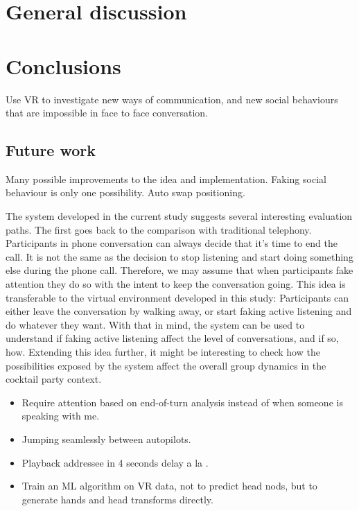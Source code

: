 \documentclass[]{simple-thesis}
\begin{document}
\chapter{General discussion}\label{general_discussion}


\chapter{Conclusions}\label{conclusions}

Use VR to investigate new ways of communication, and new social behaviours that are impossible in face to face conversation.

\section{Future work}

Many possible improvements to the idea and implementation.
Faking social behaviour is only one possibility.
Auto swap positioning.

The system developed in the current study suggests several interesting evaluation paths.
The first goes back to the comparison with traditional telephony.
Participants in phone conversation can always decide that it's time to end the call.
It is not the same as the decision to stop listening and start doing something else during the phone call.
Therefore, we may assume that when participants fake attention they do so with the intent to keep the conversation going.
This idea is transferable to the virtual environment developed in this study:
Participants can either leave the conversation by walking away, or start faking active listening and do whatever they want.
With that in mind, the system can be used to understand if faking active listening affect the level of conversations, and if so, how.
Extending this idea further, it might be interesting to check how the possibilities exposed by the system affect the overall group dynamics in the cocktail party context.

\begin{itemize}
  \item Require attention based on end-of-turn analysis instead of when someone is speaking with me.
  \item Jumping seamlessly between autopilots.
  \item Playback addressee in 4 seconds delay a la \cite{Bailenson2005}.
  \item Train an ML algorithm on VR data, not to predict head nods, but to generate hands and head transforms directly.
\end{itemize}
\end{document}

